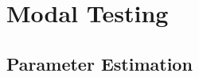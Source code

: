 \documentclass[aspectratio=169,10pt]{beamer} \mode<presentation>
\newcommand{\R}{\mathbb{R}}
\DeclareMathOperator*{\argmin}{arg\,min}
\begin{document}





\section{Modal Testing}

\subsection{Parameter Estimation}
\end{document}
